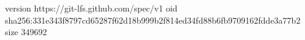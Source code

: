 version https://git-lfs.github.com/spec/v1
oid sha256:331e343f8797cd65287f62d18b999b2f814ed34fd88b6fb9709162fdde3a77b2
size 349692
